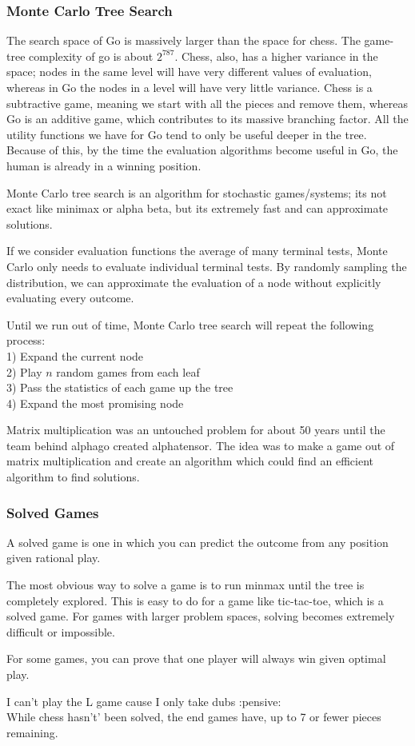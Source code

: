 \documentclass{chezarticle}
\begin{document}
\subsubsection{Monte Carlo Tree Search}
The search space of Go is massively larger than the space for chess. The game-tree complexity of go is about $2^787$. Chess, also, has a higher variance in the space; nodes in the same level will have very different values of evaluation, whereas in Go the nodes in a level will have very little variance. Chess is a subtractive game, meaning we start with all the pieces and remove them, whereas Go is an additive game, which contributes to its massive branching factor. All the utility functions we have for Go tend to only be useful deeper in the tree. Because of this, by the time the evaluation algorithms become useful in Go, the human is already in a winning position. 
\begin{proposition}
Monte Carlo tree search is an algorithm for stochastic games/systems; its not exact like minimax or alpha beta, but its extremely fast and can approximate solutions.
\end{proposition}
If we consider evaluation functions the average of many terminal tests, Monte Carlo only needs to evaluate individual terminal tests. By randomly sampling the distribution, we can approximate the evaluation of a node without explicitly evaluating every outcome. 
\begin{algorithm}
Until we run out of time, Monte Carlo tree search will repeat the following process:\\
1) Expand the current node\\
2) Play $n$ random games from each leaf\\
3) Pass the statistics of each game up the tree\\
4) Expand the most promising node
\end{algorithm}
\begin{fact}
Matrix multiplication was an untouched problem for about 50 years until the team behind alphago created alphatensor. The idea was to make a game out of matrix multiplication and create an algorithm which could find an efficient algorithm to find solutions.
\end{fact}
\subsubsection{Solved Games}
\begin{definition}
A solved game is one in which you can predict the outcome from any position given rational play.
\end{definition}
The most obvious way to solve a game is to run minmax until the tree is completely explored. This is easy to do for a game like tic-tac-toe, which is a solved game. For games with larger problem spaces, solving becomes extremely difficult or impossible.
\begin{fact}
For some games, you can prove that one player will always win given optimal play.
\end{fact}
I can't play the L game cause I only take dubs :pensive:\\
While chess hasn't' been solved, the end games have, up to 7 or fewer pieces remaining. 
\end{document}
